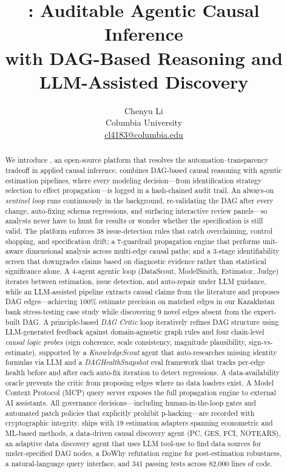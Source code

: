 \documentclass{article}
\title{\oc{}: Auditable Agentic Causal Inference \\
with DAG-Based Reasoning and LLM-Assisted Discovery}
\author{
    Chenyu Li \\
    Columbia University \\
    \href{mailto:cl4183@columbia.edu}{cl4183@columbia.edu}
}
\begin{document}
\maketitle

\begin{abstract}
We introduce \oc{}, an open-source platform that resolves the automation--transparency tradeoff in applied causal inference. \oc{} combines DAG-based causal reasoning with agentic estimation pipelines, where every modeling decision---from identification strategy selection to effect propagation---is logged in a hash-chained audit trail. An always-on \emph{sentinel loop} runs continuously in the background, re-validating the DAG after every change, auto-fixing schema regressions, and surfacing interactive review panels---so analysts never have to hunt for results or wonder whether the specification is still valid. The platform enforces 38 issue-detection rules that catch overclaiming, control shopping, and specification drift; a 7-guardrail propagation engine that performs unit-aware dimensional analysis across multi-edge causal paths; and a 3-stage identifiability screen that downgrades claims based on diagnostic evidence rather than statistical significance alone. A 4-agent agentic loop (DataScout, ModelSmith, Estimator, Judge) iterates between estimation, issue detection, and auto-repair under LLM guidance, while an LLM-assisted pipeline extracts causal claims from the literature and proposes DAG edges---achieving 100\% estimate precision on matched edges in our Kazakhstan bank stress-testing case study while discovering 9 novel edges absent from the expert-built DAG. A principle-based \emph{DAG Critic} loop iteratively refines DAG structure using LLM-generated feedback against domain-agnostic graph rules and four chain-level \emph{causal logic probes} (sign coherence, scale consistency, magnitude plausibility, sign-vs-estimate), supported by a \emph{KnowledgeScout} agent that auto-researches missing identity formulas via LLM and a \emph{DAGHealthSnapshot} eval framework that tracks per-edge health before and after each auto-fix iteration to detect regressions. A data-availability oracle prevents the critic from proposing edges where no data loaders exist. A Model Context Protocol (MCP) query server exposes the full propagation engine to external AI assistants. All governance decisions---including human-in-the-loop gates and automated patch policies that explicitly prohibit p-hacking---are recorded with cryptographic integrity. \oc{} ships with 19 estimation adapters spanning econometric and ML-based methods, a data-driven causal discovery agent (PC, GES, FCI, NOTEARS), an adaptive data discovery agent that uses LLM tool-use to find data sources for under-specified DAG nodes, a DoWhy refutation engine for post-estimation robustness, a natural-language query interface, and 341 passing tests across 82{,}000 lines of code.
\end{abstract}
\end{document}
